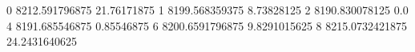 0 8212.591796875 21.76171875
1 8199.568359375 8.73828125
2 8190.830078125 0.0
4 8191.685546875 0.85546875
6 8200.6591796875 9.8291015625
8 8215.0732421875 24.2431640625
